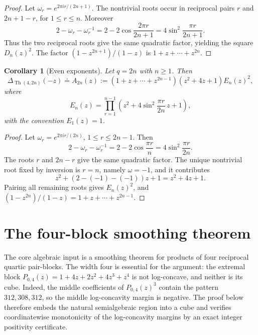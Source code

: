 \documentclass[11pt]{amsart}
\newtheorem{corollary}[theorem]{Corollary}
\newcommand{\Th}{\operatorname{Th}}
\newcommand{\dd}{\doteq}
\begin{document}
\begin{proof}
Let \(\omega_r=e^{2\pi i r/(2n+1)}\).  The nontrivial roots occur in reciprocal pairs \(r\) and \(2n+1-r\), for \(1\le r\le n\).  Moreover
\[
        2-\omega_r-\omega_r^{-1}
        =2-2\cos\frac{2\pi r}{2n+1}
        =4\sin^2\frac{\pi r}{2n+1}.
\]
Thus the two reciprocal roots give the same quadratic factor, yielding the square \(D_n(z)^2\).  The factor \((1-z^{2n+1})/(1-z)\) is \(1+z+\cdots+z^{2n}\).
\end{proof}

\begin{corollary}[Even exponents]\label{cor:even-factorization}
Let \(q=2n\) with \(n\ge1\).  Then
\begin{equation}\label{eq:even-factorization}
        \Delta_{\Th(4,2n)}(-z)
        \dd
        A_{2n}(z):=(1+z+\cdots+z^{2n-1})(z^2+4z+1)E_n(z)^2,
\end{equation}
where
\begin{equation}\label{eq:En-def}
        E_n(z)=\prod_{r=1}^{n-1}
        \left(z^2+4\sin^2\frac{\pi r}{2n}\,z+1\right),
\end{equation}
with the convention \(E_1(z)=1\).
\end{corollary}

\begin{proof}
Let \(\omega_r=e^{2\pi i r/(2n)}\), \(1\le r\le 2n-1\).  Then
\[
        2-\omega_r-\omega_r^{-1}
        =2-2\cos\frac{\pi r}{n}
        =4\sin^2\frac{\pi r}{2n}.
\]
The roots \(r\) and \(2n-r\) give the same quadratic factor.  The unique nontrivial root fixed by inversion is \(r=n\), namely \(\omega=-1\), and it contributes
\[
        z^2+(2-(-1)-(-1))z+1=z^2+4z+1.
\]
Pairing all remaining roots gives \(E_n(z)^2\), and \((1-z^{2n})/(1-z)=1+z+\cdots+z^{2n-1}\).
\end{proof}

\section{The four-block smoothing theorem}\label{sec:fourblock}

The core algebraic input is a smoothing theorem for products of four reciprocal quartic pair-blocks.  The width four is essential for the argument: the extremal block \(P_{0,4}(z)=1+4z+2z^2+4z^3+z^4\) is not log-concave, and neither is its cube.  Indeed, the middle coefficients of \(P_{0,4}(z)^3\) contain the pattern \(312,308,312\), so the middle log-concavity margin is negative.  The proof below therefore embeds the natural semialgebraic region into a cube and verifies coordinatewise monotonicity of the log-concavity margins by an exact integer positivity certificate.
\end{document}
